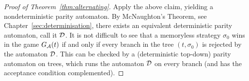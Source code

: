 \begin{proof}[Proof of Theorem~\ref{thm:alternating}]
Apply the above claim, yielding a nondeterministic parity automaton. By McNaughton's Theorem, see Chapter~\ref{sec:determinisation}, there exists an equivalent deterministic parity automaton, call it  $\mathcal{D}$. It is not difficult to see that a memoryless strategy $\sigma_0$ wins in the game $G_{\mathcal{A}}(t)$ if and only if every branch in the tree $(t,\sigma_0)$ is rejected by the automaton $\mathcal{D}$. This can be checked by a (deterministic top-down) parity automaton on trees, which runs the automaton $\mathcal{D}$ on every  branch (and has the acceptance condition complemented).
\end{proof}
